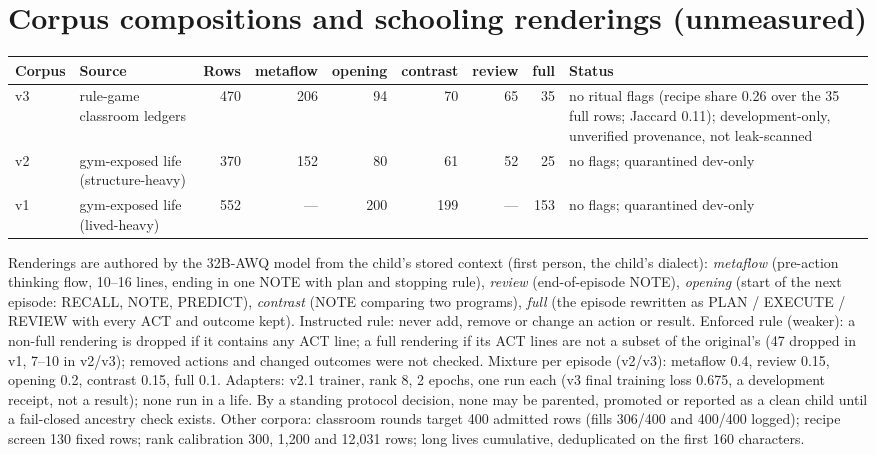\documentclass{article}
\begin{document}
\section{Corpus compositions and schooling renderings (unmeasured)}
\label{app:corpora}

\begin{center}\small
\begin{tabular}{llrrrrrrl}
\toprule
Corpus & Source & Rows & metaflow & opening & contrast & review & full & Status \\
\midrule
v3 & rule-game classroom ledgers & 470 & 206 & 94 & 70 & 65 & 35 & no ritual flags (recipe share 0.26 over the 35 full rows; Jaccard 0.11); development-only, unverified provenance, not leak-scanned \\
v2 & gym-exposed life (structure-heavy) & 370 & 152 & 80 & 61 & 52 & 25 & no flags; quarantined dev-only \\
v1 & gym-exposed life (lived-heavy) & 552 & --- & 200 & 199 & --- & 153 & no flags; quarantined dev-only \\
\bottomrule
\end{tabular}
\end{center}
Renderings are authored by the 32B-AWQ model from the child's stored context (first person, the child's dialect): \emph{metaflow} (pre-action thinking flow, 10--16 lines, ending in one NOTE with plan and stopping rule), \emph{review} (end-of-episode NOTE), \emph{opening} (start of the next episode: RECALL, NOTE, PREDICT), \emph{contrast} (NOTE comparing two programs), \emph{full} (the episode rewritten as PLAN / EXECUTE / REVIEW with every ACT and outcome kept). Instructed rule: never add, remove or change an action or result. Enforced rule (weaker): a non-full rendering is dropped if it contains any ACT line; a full rendering if its ACT lines are not a subset of the original's (47 dropped in v1, 7--10 in v2/v3); removed actions and changed outcomes were not checked. Mixture per episode (v2/v3): metaflow 0.4, review 0.15, opening 0.2, contrast 0.15, full 0.1. Adapters: v2.1 trainer, rank 8, 2 epochs, one run each (v3 final training loss 0.675, a development receipt, not a result); none run in a life. By a standing protocol decision, none may be parented, promoted or reported as a clean child until a fail-closed ancestry check exists. Other corpora: classroom rounds target 400 admitted rows (fills 306/400 and 400/400 logged); recipe screen 130 fixed rows; rank calibration 300, 1{,}200 and 12{,}031 rows; long lives cumulative, deduplicated on the first 160 characters.
\end{document}
